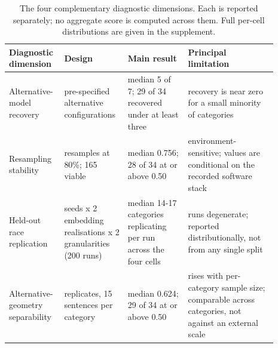 \begin{table}[H]
\centering\rmfamily\footnotesize
\caption{The four complementary diagnostic dimensions. Each is reported separately; no aggregate score is computed across them. Full per-cell distributions are given in the supplement.}
\label{tab:diagnostics}
\setlength{\tabcolsep}{5pt}
\begin{tabular}{>{\raggedright\arraybackslash}p{0.146\linewidth}>{\raggedright\arraybackslash}p{0.212\linewidth}>{\raggedright\arraybackslash}p{0.216\linewidth}>{\raggedright\arraybackslash}p{0.318\linewidth}}
\toprule
Diagnostic dimension & Design & Main result & Principal limitation \\
\midrule
Alternative-model recovery & 7 pre-specified alternative configurations & median 5 of 7; 29 of 34 recovered under at least three & recovery is near zero for a small minority of categories \\
Resampling stability & 200 resamples at 80\%; 165 viable & median 0.756; 28 of 34 at or above 0.50 & environment-sensitive; values are conditional on the recorded software stack \\
Held-out race replication & 50 seeds x 2 embedding realisations x 2 granularities (200 runs) & median 14-17 categories replicating per run across the four cells & 47 runs degenerate; reported distributionally, not from any single split \\
Alternative-geometry separability & 100 replicates, 15 sentences per category & median 0.624; 29 of 34 at or above 0.50 & rises with per-category sample size; comparable across categories, not against an external scale \\
\bottomrule
\end{tabular}
\end{table}
